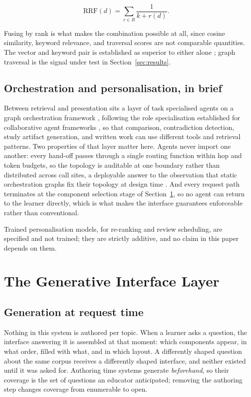 \documentclass[conference]{IEEEtran}
\begin{document}
\begin{equation}
\mathrm{RRF}(d) = \sum_{r \in R} \frac{1}{k + r(d)}.
\end{equation}

Fusing by rank is what makes the combination possible at all, since cosine similarity, keyword relevance, and traversal scores are not comparable quantities. The vector and keyword pair is established as superior to either alone \cite{ref:hybridrag}; graph traversal is the signal under test in Section~\ref{sec:results}.

\subsection{Orchestration and personalisation, in brief}
Between retrieval and presentation sits a layer of task specialised agents on a graph orchestration framework \cite{ref:langgraph}, following the role specialisation established for collaborative agent frameworks \cite{ref:metagpt}, so that comparison, contradiction detection, study artifact generation, and written work can use different tools and retrieval patterns. Two properties of that layer matter here. Agents never import one another: every hand-off passes through a single routing function within hop and token budgets, so the topology is auditable at one boundary rather than distributed across call sites, a deployable answer to the observation that static orchestration graphs fix their topology at design time \cite{ref:adaptorch}. And every request path terminates at the component selection stage of Section~\ref{sec:genui}, so no agent can return to the learner directly, which is what makes the interface guarantees enforceable rather than conventional.

Trained personalisation models, for re-ranking and review scheduling, are specified and not trained; they are strictly additive, and no claim in this paper depends on them.
\section{The Generative Interface Layer}
\label{sec:genui}

\subsection{Generation at request time}
Nothing in this system is authored per topic. When a learner asks a question, the interface answering it is assembled at that moment: which components appear, in what order, filled with what, and in which layout. A differently shaped question about the same corpus receives a differently shaped interface, and neither existed until it was asked for. Authoring time systems generate \emph{beforehand}, so their coverage is the set of questions an educator anticipated; removing the authoring step changes coverage from enumerable to open.
\end{document}
